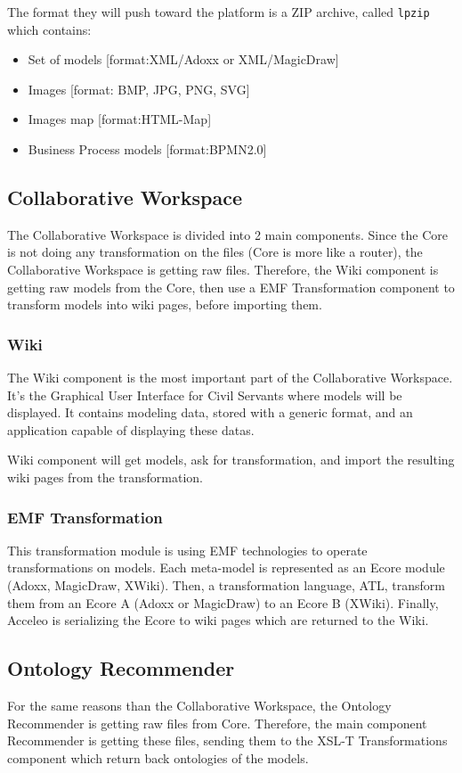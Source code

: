 \documentclass{learnpad}
\begin{document}
The format they will push toward the \learnpad platform is a ZIP archive, called \verb+lpzip+ which contains:
\begin{itemize}
	\item Set of models [format:XML/Adoxx or XML/MagicDraw]
	\item Images [format: BMP, JPG, PNG, SVG]
	\item Images map [format:HTML-Map]
	\item Business Process models [format:BPMN2.0]
\end{itemize}

\subsection{Collaborative Workspace}
The Collaborative Workspace is divided into 2 main components.  Since the
\learnpad Core is not doing any transformation on the files (\learnpad Core is
more like a router), the Collaborative Workspace is getting raw files.
Therefore, the Wiki component is getting raw models from the \learnpad Core,
then use a EMF Transformation component to transform models into wiki pages,
before importing them.

\subsubsection{Wiki}
The Wiki component is the most important part of the Collaborative Workspace.
It's the Graphical User Interface for Civil Servants where models will be
displayed.  It contains modeling data, stored with a generic format, and an
application capable of displaying these datas.

Wiki component will get models, ask for transformation, and import the resulting
wiki pages from the transformation.

\subsubsection{EMF Transformation}
This transformation module is using EMF technologies to operate transformations
on models.  Each meta-model is represented as an Ecore module (Adoxx, MagicDraw,
XWiki).  Then, a transformation language, ATL, transform them from an Ecore A
(Adoxx or MagicDraw) to an Ecore B (XWiki).  Finally, Acceleo is serializing the
Ecore to wiki pages which are returned to the Wiki.

\subsection{Ontology Recommender}
For the same reasons than the Collaborative Workspace, the Ontology Recommender
is getting raw files from \learnpad Core.  Therefore, the main component
Recommender is getting these files, sending them to the XSL-T Transformations
component which return back ontologies of the models.
\end{document}

